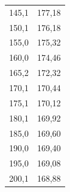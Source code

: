 \documentclass[a4paper, 12pt]{article}
\begin{document}
\begin{table}[hbt!]
\begin{tabular}{|c | c|}
		145,1             & 177,18            \\
		150,1             & 176,18            \\
		155,0             & 175,32            \\
		160,0             & 174,46            \\
		165,2             & 172,32            \\
		\rowcolor[HTML]{FFFF00} 
		170,1             & 170,44            \\
		175,1             & 170,12            \\
		180,1             & 169,92            \\
		185,0             & 169,60            \\
		190,0             & 169,40            \\
		195,0             & 169,08            \\
		200,1             & 168,88  \\ 
		\hline
	\end{tabular}

\end{table}
\newpage
	
\end{document}
